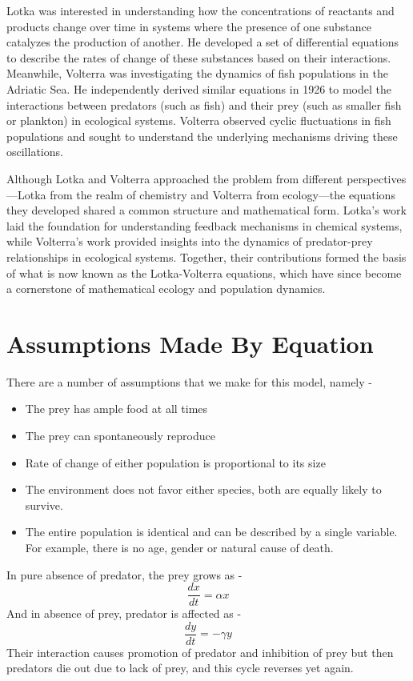 \documentclass{article}
\begin{document}
Lotka was interested in understanding how the concentrations of reactants and products change over time in systems where the presence of one substance catalyzes the production of another. He developed a set of differential equations to describe the rates of change of these substances based on their interactions. \\

Meanwhile, Volterra was investigating the dynamics of fish populations in the Adriatic Sea. He independently derived similar equations in 1926 to model the interactions between predators (such as fish) and their prey (such as smaller fish or plankton) in ecological systems. Volterra observed cyclic fluctuations in fish populations and sought to understand the underlying mechanisms driving these oscillations. \newline

Although Lotka and Volterra approached the problem from different perspectives—Lotka from the realm of chemistry and Volterra from ecology—the equations they developed shared a common structure and mathematical form. Lotka's work laid the foundation for understanding feedback mechanisms in chemical systems, while Volterra's work provided insights into the dynamics of predator-prey relationships in ecological systems. Together, their contributions formed the basis of what is now known as the Lotka-Volterra equations, which have since become a cornerstone of mathematical ecology and population dynamics.

\section{Assumptions Made By Equation}
There are a number of assumptions that we make for this model, namely - 
\begin{itemize}


    \item The prey has ample food at all times
    \item The prey can spontaneously reproduce
    \item Rate of change of either population is proportional to its size
    \item The environment does not favor either species, both are equally likely to survive.
    \item The entire population is identical and can be described by a single variable. For example, there is no age, gender or natural cause of death. 
\end{itemize}
In pure absence of predator, the prey grows as - 
\[\frac{dx}{dt} = \alpha x\]
And in absence of prey, predator is affected as - 
\[\frac{dy}{dt} = -\gamma y\]
Their interaction causes promotion of predator and inhibition of prey but then predators die out due to lack of prey, and this cycle reverses yet again.
\end{document}
